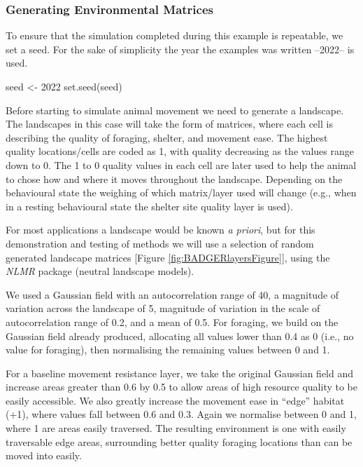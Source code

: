 \documentclass[10pt,a4paper]{article}
\newenvironment{Shaded}{}{}
\newcommand{\DecValTok}[1]{#1}
\newcommand{\FunctionTok}[1]{#1}
\newcommand{\NormalTok}[1]{#1}
\newcommand{\OtherTok}[1]{#1}
\begin{document}
\hypertarget{generating-environmental-matrices}{%
\subsubsection{Generating Environmental Matrices}\label{generating-environmental-matrices}}

To ensure that the simulation completed during this example is repeatable, we set a seed.
For the sake of simplicity the year the examples was written --2022-- is used.

\begin{Shaded}
\begin{Highlighting}[]
\NormalTok{seed }\OtherTok{\textless{}{-}} \DecValTok{2022}
\FunctionTok{set.seed}\NormalTok{(seed)}
\end{Highlighting}
\end{Shaded}

Before starting to simulate animal movement we need to generate a landscape.
The landscapes in this case will take the form of matrices, where each cell is describing the quality of foraging, shelter, and movement ease.
The highest quality locations/cells are coded as 1, with quality decreasing as the values range down to 0.
The 1 to 0 quality values in each cell are later used to help the animal to chose how and where it moves throughout the landscape.
Depending on the behavioural state the weighing of which matrix/layer used will change (e.g., when in a resting behavioural state the shelter site quality layer is used).

For most applications a landscape would be known \emph{a priori}, but for this demonstration and testing of methods we will use a selection of random generated landscape matrices {[}Figure \ref{fig:BADGERlayersFigure}{]}, using the \emph{NLMR} package (neutral landscape models).

We used a Gaussian field with an autocorrelation range of 40, a magnitude of variation across the landscape of 5, magnitude of variation in the scale of autocorrelation range of 0.2, and a mean of 0.5.
For foraging, we build on the Gaussian field already produced, allocating all values lower than 0.4 as 0 (i.e., no value for foraging), then normalising the remaining values between 0 and 1.

For a baseline movement resistance layer, we take the original Gaussian field and increase areas greater than 0.6 by 0.5 to allow areas of high resource quality to be easily accessible.
We also greatly increase the movement ease in ``edge'' habitat (+1), where values fall between 0.6 and 0.3.
Again we normalise between 0 and 1, where 1 are areas easily traversed.
The resulting environment is one with easily traversable edge areas, surrounding better quality foraging locations than can be moved into easily.
\end{document}
